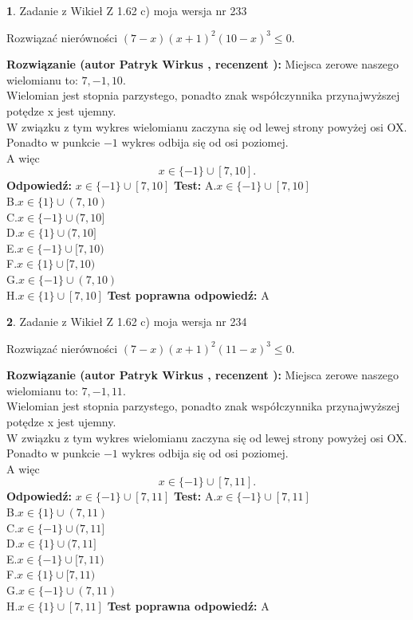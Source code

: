 \documentclass[12pt, a4paper]{article}
\theoremstyle{definition} %
\newtheorem{zad}{}
\newcommand{\zadStart}[1]{\begin{zad}#1\newline}
\newcommand{\zadStop}{\end{zad}}
\newcommand{\rozwStart}[2]{\noindent \textbf{Rozwiązanie (autor #1 , recenzent #2): }\newline}
\newcommand{\rozwStop}{\newline}
\newcommand{\odpStart}{\noindent \textbf{Odpowiedź:}\newline}
\newcommand{\odpStop}{\newline}
\newcommand{\testStart}{\noindent \textbf{Test:}\newline}
\newcommand{\testStop}{\newline}
\newcommand{\kluczStart}{\noindent \textbf{Test poprawna odpowiedź:}\newline}
\newcommand{\kluczStop}{\newline}
\begin{document}
\zadStart{Zadanie z Wikieł Z 1.62 c) moja wersja nr 233}

Rozwiązać nierówności $(7-x)(x+1)^{2}(10-x)^{3}\le0$.
\zadStop
\rozwStart{Patryk Wirkus}{}
Miejsca zerowe naszego wielomianu to: $7, -1, 10$.\\
Wielomian jest stopnia parzystego, ponadto znak współczynnika przy\linebreak najwyższej potędze x jest ujemny.\\ W związku z tym wykres wielomianu zaczyna się od lewej strony powyżej osi OX.\\
Ponadto w punkcie $-1$ wykres odbija się od osi poziomej.\\
A więc $$x \in \{-1\} \cup [7,10].$$
\rozwStop
\odpStart
$x \in \{-1\} \cup [7,10]$
\odpStop
\testStart
A.$x \in \{-1\} \cup [7,10]$\\
B.$x \in \{1\} \cup (7,10)$\\
C.$x \in \{-1\} \cup (7,10]$\\
D.$x \in \{1\} \cup (7,10]$\\
E.$x \in \{-1\} \cup [7,10)$\\
F.$x \in \{1\} \cup [7,10)$\\
G.$x \in \{-1\} \cup (7,10)$\\
H.$x \in \{1\} \cup [7,10]$
\testStop
\kluczStart
A
\kluczStop



\zadStart{Zadanie z Wikieł Z 1.62 c) moja wersja nr 234}

Rozwiązać nierówności $(7-x)(x+1)^{2}(11-x)^{3}\le0$.
\zadStop
\rozwStart{Patryk Wirkus}{}
Miejsca zerowe naszego wielomianu to: $7, -1, 11$.\\
Wielomian jest stopnia parzystego, ponadto znak współczynnika przy\linebreak najwyższej potędze x jest ujemny.\\ W związku z tym wykres wielomianu zaczyna się od lewej strony powyżej osi OX.\\
Ponadto w punkcie $-1$ wykres odbija się od osi poziomej.\\
A więc $$x \in \{-1\} \cup [7,11].$$
\rozwStop
\odpStart
$x \in \{-1\} \cup [7,11]$
\odpStop
\testStart
A.$x \in \{-1\} \cup [7,11]$\\
B.$x \in \{1\} \cup (7,11)$\\
C.$x \in \{-1\} \cup (7,11]$\\
D.$x \in \{1\} \cup (7,11]$\\
E.$x \in \{-1\} \cup [7,11)$\\
F.$x \in \{1\} \cup [7,11)$\\
G.$x \in \{-1\} \cup (7,11)$\\
H.$x \in \{1\} \cup [7,11]$
\testStop
\kluczStart
A
\kluczStop
\end{document}
